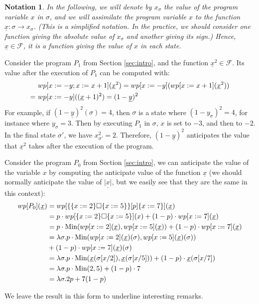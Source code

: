 \documentclass[a4paper,10pt]{llncs}
\newtheorem{notation}{Notation}
\def\Min {\textnormal {Min}}
\begin{document}
\begin{notation} In the following, we will denote by $x_\sigma$ the value of the program variable $x$ in $\sigma$, and we will assimilate the program variable $x$ to the function $\underline{x} : \sigma \rightarrow x_\sigma$. (This is a simplified notation. In the practice, we should consider one function giving the absolute value of $x_\sigma$ and another giving its sign.) Hence, $\underline{x} \in \mathcal{F}$, it is a function giving the value of $x$ in each state.
\end{notation}

\begin{example} Consider the program $P_1$ from Section \ref{sec:intro}, and the function $\underline{x}^2 \in \mathcal{F}$. Its value after the execution of $P_1$ can be computed with:
\begin{align*}
& \textnormal{ }wp[x := - y ; x := x+1](\underline{x}^2) = wp[x := - y ](wp[x := x+1](\underline{x}^2)) \\
 =& \textnormal{ }wp[x := - y ]((\underline{x}+1)^2) = (1-\underline{y})^2  \\
\end{align*}
For example, if $(1-\underline{y})^2(\sigma) = 4$, then $\sigma$ is a state where $(1-y_\sigma)^2 = 4$, for instance where $y_\sigma = 3$. Then by executing $P_1$ in $\sigma$, $x$ is set to $-3$, and then to $-2$. In the final state $\sigma'$, we have $x_{\sigma'}^2 = 2$. Therefore, $(1-\underline{y})^2$ anticipates the value that $\underline{x}^2$ takes after the execution of the program.
\end{example}

\begin{example} Consider the program $P_0$ from Section \ref{sec:intro}, we can anticipate the value of the variable $x$ by computing the anticipate value of the function $\underline{x}$ (we should normally anticipate the value of $\underline{|x|}$, but we easily see that they are the same in this context):
\begin{align*}
wp[P_0](\underline{x}) &= wp[ \{ \{x := 2\} \square \{x := 5\} \} [p] \{ x := 7 \} ](\underline{x}) \\
&= p\cdot wp[ \{x := 2\} \square \{x := 5\} ](x) + (1-p)\cdot wp[x := 7](\underline{x}) \\
&= p\cdot\Min(wp[x := 2](\underline{x}),wp[x := 5](\underline{x})) + (1-p)\cdot wp[x := 7](\underline{x}) \\
&= \lambda\sigma. p\cdot\Min(wp[x := 2](\underline{x})(\sigma),wp[x := 5](\underline{x})(\sigma))\\ & + (1-p)\cdot wp[x := 7](\underline{x})(\sigma) \\
&= \lambda\sigma. p\cdot\Min(\underline{x}(\sigma[x/2]),\underline{x}(\sigma[x/5])) + (1-p)\cdot \underline{x}(\sigma[x/7]) \\
&= \lambda\sigma. p\cdot\Min(2,5) + (1-p)\cdot 7 \\
&= \lambda\sigma. 2p+7(1-p)
\end{align*}
\end{example}
We leave the result in this form to underline interesting remarks.
\end{document}
